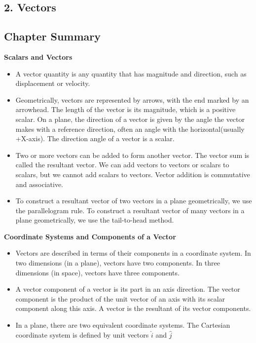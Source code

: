 \documentclass[12pt,addpoints]{exam}
\begin{document}
\begin{questions}
\begin{center}
			\section*{2. Vectors}
			\subsection*{Chapter Summary}
			\textbf{Scalars and Vectors} 
		\end{center}
		\begin{itemize}
			\item A vector quantity is any quantity that has magnitude and direction, such as displacement or velocity.
			\item Geometrically, vectors are represented by arrows, with the end marked by an arrowhead. The length of the vector is its magnitude, which is a positive scalar. On a plane, the direction of a vector is given by the angle the vector makes with a reference direction, often an angle with the horizontal(usually +X-axis). The direction angle of a vector is a scalar.			
			\item Two or more vectors can be added to form another vector. The vector sum is called the resultant vector. We can add vectors to vectors or scalars to scalars, but we cannot add scalars to vectors. Vector addition is commutative and associative.
			\item To construct a resultant vector of two vectors in a plane geometrically, we use the parallelogram rule. To construct a resultant vector of many vectors in a plane geometrically, we use the tail-to-head method.
		\end{itemize}
		\begin{center}
			\textbf{Coordinate Systems and Components of a Vector} 
		\end{center}
		\begin{itemize}
			\item Vectors are described in terms of their components in a coordinate system. In two dimensions (in a plane), vectors have two components. In three dimensions (in space), vectors have three components.
			\item A vector component of a vector is its part in an axis direction. The vector component is the product of the unit vector of an axis with its scalar component along this axis. A vector is the resultant of its vector components.
			\item In a plane, there are two equivalent coordinate systems. The Cartesian coordinate system is defined by unit vectors  $\hat{i}$ and  $\hat{j}$

\end{itemize}
\end{questions}
\end{document}
